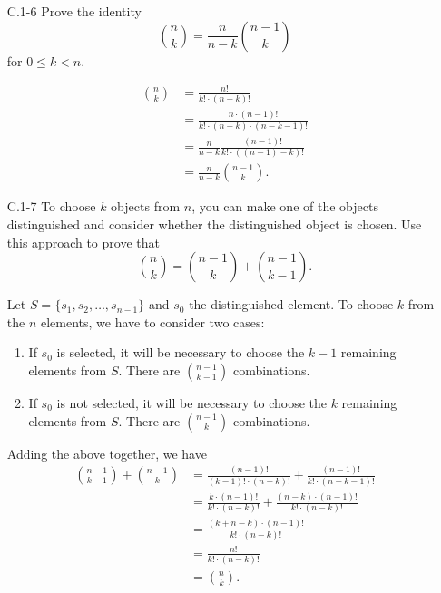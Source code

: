 \documentclass{report}
\makeatletter
\renewenvironment{framed}{%
 \def\FrameCommand##1{\hskip\@totalleftmargin
 \fboxsep=\FrameSep\fbox{##1}}%
 \MakeFramed {\advance\hsize-\width
   \@totalleftmargin\z@ \linewidth\hsize
   \@setminipage}}%
 {\par\unskip\endMakeFramed}
\makeatother
\begin{document}
\begin{enumerate}
\item[C.1{-}6] {Prove the identity
\[
  \binom{n}{k} = \frac{n}{n - k} \binom{n - 1}{k}
\]
for $0 \le k < n$.
}

\begin{framed}
\begin{equation*}
\begin{aligned}
  \binom{n}{k} &= \frac{n!}{k! \cdot (n - k)!}\\
               &= \frac{n \cdot (n - 1)!}{k! \cdot (n - k) \cdot (n - k - 1)!}\\
               &= \frac{n}{n - k} \frac{(n - 1)!}{k! \cdot ((n - 1) - k)!}\\
               &= \frac{n}{n - k} \binom{n - 1}{k}.
\end{aligned}
\end{equation*}
\end{framed}

\item[C.1{-}7] {To choose $k$ objects from $n$, you can make one of the objects
distinguished and consider whether the distinguished object is chosen. Use this
approach to prove that
\[
  \binom{n}{k} = \binom{n - 1}{k} + \binom{n - 1}{k - 1}.
\]
}

\begin{framed}
Let $S = \{s_1, s_2, \dots, s_{n - 1}\}$ and $s_0$ the
distinguished element. To choose $k$ from the $n$ elements, we have to consider
two cases:
\begin{enumerate}
  \item If $s_0$ is selected, it will be necessary to choose the $k - 1$
    remaining elements from $S$. There are $\binom{n - 1}{k - 1}$ combinations.
  \item If $s_0$ is not selected, it will be necessary to choose the $k$
    remaining elements from $S$. There are $\binom{n - 1}{k}$ combinations.
\end{enumerate}
Adding the above together, we have
\begin{equation*}
\begin{aligned}
  \binom{n - 1}{k - 1} + \binom{n - 1}{k}
  &= \frac{(n - 1)!}{(k - 1)! \cdot (n - k)!} + \frac{(n - 1)!}{k! \cdot (n - k - 1)!}\\
  &= \frac{k \cdot (n - 1)!}{k! \cdot (n - k)!} + \frac{(n - k) \cdot (n - 1)!}{k! \cdot (n - k)!}\\
  &= \frac{(k + n - k) \cdot (n - 1)!}{k! \cdot (n - k)!}\\
  &= \frac{n!}{k! \cdot (n - k)!}\\
  &= \binom{n}{k}.
\end{aligned}
\end{equation*}
\end{framed}


\end{enumerate}
\end{document}
